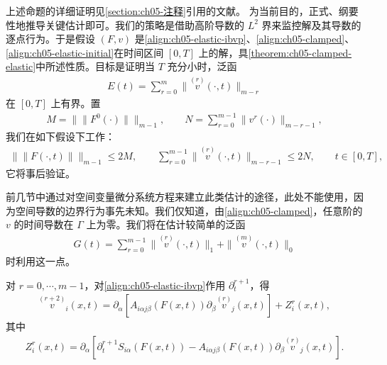 \documentclass[../../main.tex]{subfiles}
\begin{document}
上述命题的详细证明见\cref{section:ch05-注释}引用的文献。
为当前目的，正式、纲要性地推导关键估计即可。我们的策略是借助高阶导数的 $L^{2}$ 界来监控解及其导数的逐点行为。于是假设 $(F,v)$ 是\eqref{align:ch05-elastic-ibvp}、\eqref{align:ch05-clamped}、\eqref{align:ch05-elastic-initial}在时间区间 $[0,T]$ 上的解，具\cref{theorem:ch05-clamped-elastic}中所述性质。目标是证明当 $T$ 充分小时，泛函
\begin{align}
E(t)=\sum_{r=0}^{m}\|\overset{(r)}{v}(\cdot,t)\|_{m-r}\label{align:ch05-E-def}
\end{align}
在 $[0,T]$ 上有界。置
\begin{align}
M=\|\|F^{0}(\cdot)\|\|_{m-1},\qquad N=\sum_{r=0}^{m-1}\|v^{r}(\cdot)\|_{m-r-1},\label{align:ch05-MN}
\end{align}
我们在如下假设下工作：
\begin{align}
\|\|F(\cdot,t)\|\|_{m-1}\leqslant2M,\qquad\sum_{r=0}^{m-1}\|\overset{(r)}{v}(\cdot,t)\|_{m-r-1}\leqslant2N,\qquad t\in[0,T],\label{align:ch05-ansatz}
\end{align}
它将事后验证。

前几节中通过对空间变量微分系统方程来建立此类估计的途径，此处不能使用，因为空间导数的边界行为事先未知。我们仅知道，由\eqref{align:ch05-clamped}，任意阶的 $v$ 的时间导数在 $\Gamma$ 上为零。我们将在估计较简单的泛函
\begin{align}
G(t)=\sum_{r=0}^{m-1}\|\overset{(r)}{v}(\cdot,t)\|_{1}+\|\overset{(m)}{v}(\cdot,t)\|_{0}\label{align:ch05-G-def}
\end{align}
时利用这一点。

对 $r=0,\cdots,m-1$，对\eqref{align:ch05-elastic-ibvp}作用 $\partial_{t}^{r+1}$，得
\begin{align}
\overset{(r+2)}{v}_{i}(x,t)=\partial_{\alpha}[A_{i\alpha j\beta}(F(x,t))\partial_{\beta}\overset{(r)}{v}_{j}(x,t)]+Z_{i}^{r}(x,t),\label{align:ch05-vr2}
\end{align}
其中
\begin{align}
Z_{i}^{r}(x,t)=\partial_{\alpha}[\partial_{t}^{r+1}S_{i\alpha}(F(x,t))-A_{i\alpha j\beta}(F(x,t))\partial_{\beta}\overset{(r)}{v}_{j}(x,t)].\label{align:ch05-Zr-def}
\end{align}
\end{document}
